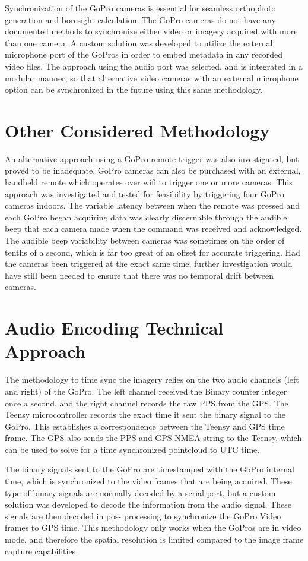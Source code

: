 Synchronization of the GoPro cameras is essential for seamless orthophoto generation and boresight calculation.  The GoPro cameras do not have any documented methods to synchronize either video or imagery acquired with more than one camera.  A custom solution was developed to utilize the external microphone port of the GoPros in order to embed metadata in any recorded video files.  The approach using the audio port was selected, and is integrated in a modular manner, so that alternative video cameras with an external microphone option can be synchronized in the future using this same methodology.  
\section{Other Considered Methodology}
An alternative approach using a GoPro remote trigger was also investigated, but proved to be inadequate.  GoPro cameras can also be purchased with an external, handheld remote which operates over wifi to trigger one or more cameras.  This approach was investigated and tested for feasibility by triggering four GoPro cameras indoors.  The variable latency between when the remote was pressed and each GoPro began acquiring data was clearly discernable through the audible beep that each camera made when the command was received and acknowledged.  The audible beep variability between cameras was sometimes on the order of tenths of a second, which is far too great of an offset for accurate triggering.  Had the cameras been triggered at the exact same time, further investigation would have still been needed to ensure that there was no temporal drift between cameras. 

\section{Audio Encoding Technical Approach}
The methodology to time sync the imagery relies on the two audio channels (left and right) of the GoPro.  The left channel received the Binary counter integer once a second, and the right channel records the raw PPS from the GPS.  The Teensy microcontroller records the exact time it sent the binary signal to the GoPro.  This establishes a correspondence between the Teensy and GPS time frame.  The GPS also sends the PPS and GPS NMEA string to the Teensy, which can be used to solve for a time synchronized pointcloud to UTC time.

The binary signals sent to the GoPro are timestamped with the GoPro internal time, which is synchronized to the video frames that are being acquired.  These type of binary signals are normally decoded by a serial port, but a custom solution was developed to decode the information from the audio signal.  These signals are then decoded in pos- processing to synchronize the GoPro Video frames to GPS time.  This methodology only works when the GoPros are in video mode, and therefore the spatial resolution is limited compared to the image frame capture capabilities.

